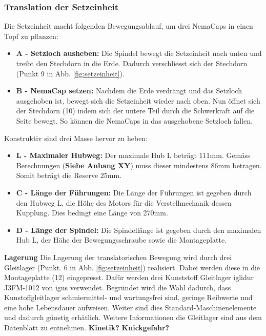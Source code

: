  
\subsubsection{Translation der Setzeinheit}
Die Setzeinheit macht folgenden Bewegungsablauf, um drei NemaCaps in einen Topf zu pflanzen:
\begin{itemize}
	\item \textbf{A - Setzloch ausheben:} Die Spindel bewegt die Setzeinheit nach unten und treibt den Stechdorn in die Erde. Dadurch verschliesst sich der Stechdorn (Punkt 9 in Abb. \ref{fig:setzeinheit}). 

	\item \textbf{B - NemaCap setzen:} Nachdem die Erde verdrängt und das Setzloch ausgehoben ist, bewegt sich die Setzeinheit wieder nach oben. Nun öffnet sich der Stechdorn (10) indem sich der untere Teil durch die Schwerkraft auf die Seite bewegt. So können die NemaCaps in das ausgehobene Setzloch fallen.
\end{itemize}

Konstruktiv sind drei Masse hervor zu heben:
\begin{itemize}
	\item \textbf{L - Maximaler Hubweg:} Der maximale Hub L beträgt 111mm. Gemäss Berechnungen (\textbf{Siehe Anhang XY}) muss dieser mindestens 86mm betragen. Somit beträgt die Reserve 25mm. 
	
	\item \textbf{C - Länge der Führungen:} Die Länge der Führungen ist gegeben durch den Hubweg L, die Höhe des Motors für die Verstellmechanik dessen Kupplung. Dies bedingt eine Länge von 270mm.
	
	\item \textbf{D - Länge der Spindel:} Die Spindellänge ist gegeben durch den maximalen Hub L, der Höhe der Bewegungsschraube sowie die Montageplatte.
\end{itemize}
\textbf{Lagerung}
\newline
Die Lagerung der translatorischen Bewegung wird durch drei Gleitlager (Punkt. 6 in Abb. \ref{fig:setzeinheit}) realisiert. Dabei werden diese in die Montageplatte (12) eingepresst. Dafür werden drei Kunststoff Gleitlager iglidur J3FM-1012 von igus verwendet. Begründet wird die Wahl dadurch, dass Kunstoffgleitlager schmiermittel- und wartungsfrei sind, geringe Reibwerte und eine hohe Lebensdauer aufweisen. Weiter sind dies Standard-Maschinenelemente und dadurch günstig erhätlich. Weitere Informationen die Gleitlager sind aus dem Datenblatt zu entnehmen.
\newline
\textbf{Kinetik?}
\newline
\textbf{Knickgefahr?}
\newline


